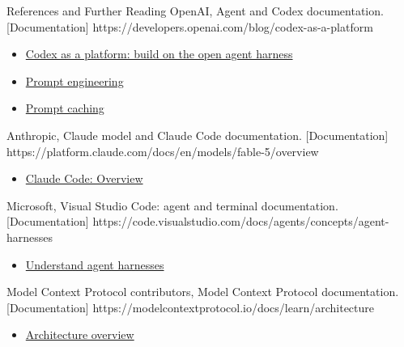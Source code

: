 \begin{frame}{References and Further Reading}
  {OpenAI, Agent and Codex documentation. [Documentation]}
  {https://developers.openai.com/blog/codex-as-a-platform}
  {\begin{itemize}
\item \href{https://developers.openai.com/blog/codex-as-a-platform}{Codex as a platform: build on the open agent harness}
\item \href{https://developers.openai.com/api/docs/guides/prompt-engineering}{Prompt engineering}
\item \href{https://developers.openai.com/api/docs/guides/prompt-caching}{Prompt caching}
\end{itemize}}
  {Anthropic, Claude model and Claude Code documentation. [Documentation]}
  {https://platform.claude.com/docs/en/models/fable-5/overview}
  {\begin{itemize}
\item \href{https://code.claude.com/docs/en/overview}{Claude Code: Overview}
\end{itemize}}
  {Microsoft, Visual Studio Code: agent and terminal documentation. [Documentation]}
  {https://code.visualstudio.com/docs/agents/concepts/agent-harnesses}
  {\begin{itemize}
\item \href{https://code.visualstudio.com/docs/agents/concepts/agent-harnesses}{Understand agent harnesses}
\end{itemize}}
  {Model Context Protocol contributors, Model Context Protocol documentation. [Documentation]}
  {https://modelcontextprotocol.io/docs/learn/architecture}
  {\begin{itemize}
\item \href{https://modelcontextprotocol.io/docs/learn/architecture}{Architecture overview}
\end{itemize}}
\end{frame}
